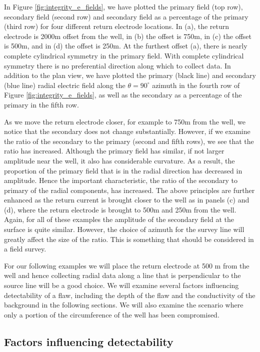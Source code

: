 In Figure \ref{fig:integrity_e_fields}, we have plotted the  primary field (top row), secondary field (second row) and secondary field as a percentage of the primary (third row) for four different return electrode locations. In (a), the return electrode is 2000m offset from the well, in (b) the offset is 750m, in (c) the offset is 500m, and in (d) the offset is 250m. At the furthest offset (a), there is nearly complete cylindrical symmetry in the primary field. With complete cylindrical symmetry there is no preferential direction along which to collect data. In addition to the plan view, we have plotted the primary (black line) and secondary (blue line) radial electric field along the $\theta = 90^\circ$ azimuth in the fourth row of Figure \ref{fig:integrity_e_fields}, as well as the secondary as a percentage of the primary in the fifth row.



As we move the return electrode closer, for example to 750m from the well, we notice that the secondary does not change substantially. However, if we examine the ratio of the secondary to the primary (second and fifth rows), we see that the ratio has increased. Although the primary field has similar, if not larger amplitude near the well, it also has considerable curvature. As a result, the proportion of the primary field that is in the radial direction has decreased in amplitude. Hence the important characteristic, the ratio of the secondary to primary of the radial components, has increased. The above principles are further enhanced as the return current is brought closer to the well as in panels (c) and (d), where the return electrode is brought to 500m and 250m from the well.  Again, for all of these examples the amplitude of the secondary field at the surface is quite similar. However, the choice of azimuth for the survey line will greatly affect the size of the ratio. This is something that should be considered in a field survey.

For our following examples we will place the return electrode at 500 m from the well and hence collecting radial data along a line that is perpendicular to the source line will be a good choice. We will examine several factors influencing detectability of a flaw, including the depth of the flaw and the conductivity of the background in the following sections. We will also examine the scenario where only a portion of the circumference of the well has been compromised.

\subsection{Factors influencing detectability}
